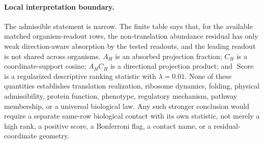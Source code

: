 \paragraph{Local interpretation boundary.}
The admissible statement is narrow.  The finite table says that, for the available matched organism-readout rows, the non-translation abundance residual has only weak direction-aware absorption by the tested readouts, and the leading readout is not shared across organisms.  $A_H$ is an absorbed projection fraction; $C_H$ is a coordinate-support cosine; $A_HC_H$ is a directional projection product; and $\operatorname{Score}$ is a regularized descriptive ranking statistic with $\lambda=0.01$.  None of these quantities establishes translation realization, ribosome dynamics, folding, physical admissibility, protein function, phenotype, regulatory mechanism, pathway membership, or a universal biological law.  Any such stronger conclusion would require a separate same-row biological contact with its own statistic, not merely a high rank, a positive score, a Bonferroni flag, a contact name, or a residual-coordinate geometry.

